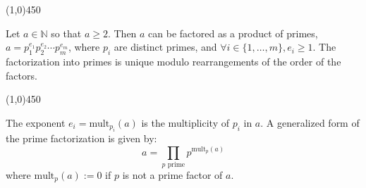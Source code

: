     \begin{center}
        \vspace{10pt}
        \line(1,0){450}
        \vspace{25pt}
    \end{center}
    
    \begin{theorem}
    Let $a \in \mathbb{N}$ so that $a \geq 2$. Then $a$ can be factored as a product of primes, $a = p_1^{e_1}p_2^{e_2} \cdots p_m^{e_m}$, where $p_i$ are distinct primes, and $\forall i \in \{1, \dots, m\}, e_i \geq 1$.
    The factorization into primes is unique modulo rearrangements of the order of the factors.
    \end{theorem}
    
\begin{center}
    \vspace{10pt}
    \line(1,0){450}
    \vspace{25pt}
\end{center}
    
    \begin{remark}
    The exponent $e_i = \text{mult}_{p_i}(a)$ is the multiplicity of $p_i$ in $a$.
    A generalized form of the prime factorization is given by:
    $$ a = \prod_{p \text{ prime}} p^{\text{mult}_p(a)} $$
    where $\text{mult}_p(a) := 0$ if $p$ is not a prime factor of $a$.
    \end{remark}
